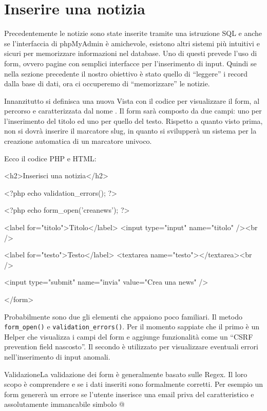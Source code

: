 \section*{Inserire una notizia}
Precedentemente le notizie sono state inserite tramite una istruzione SQL e anche se l'interfaccia di phpMyAdmin è amichevole, esistono altri sistemi più intuitivi e sicuri per memorizzare informazioni nel database. Uno di questi prevede l'uso di form, ovvero pagine con semplici interfacce per l'inserimento di input. Quindi se nella sezione precedente il nostro obiettivo è stato quello di ``leggere'' i record dalla base di dati, ora ci occuperemo di ``memorizzare'' le notizie.

Innanzitutto si definisca una nuova Vista con il codice per visualizzare il form, al percorso  e caratterizzata dal nome . Il form sarà composto da due campi: uno per l'inserimento del titolo ed uno per quello del testo. Rispetto a quanto visto prima, non si dovrà inserire il marcatore slug, in quanto si svilupperà un sistema per la creazione automatica di un marcatore univoco.

Ecco il codice \ac{PHP} e \ac{HTML}:

\begin{code}
<h2>Inserisci una notizia</h2>

<?php echo validation_errors(); ?>

<?php echo form_open('creanews'); ?>

	<label for="titolo">Titolo</label>
	<input type="input" name="titolo" /><br />

	<label for="testo">Testo</label>
	<textarea name="testo"></textarea><br />

	<input type="submit" name="invia" value="Crea una news" />

</form>
\end{code}

Probabilmente sono due gli elementi che appaiono poco familiari. Il metodo \verb|form_open()| e \verb|validation_errors()|. Per il momento sappiate che il primo è un Helper che visualizza i campi del form e aggiunge funzionalità come un ``CSRF prevention field nascosto''. Il secondo è utilizzato per visualizzare eventuali errori nell'inserimento di input anomali.

\begin{deftab}{Validazione}{La validazione dei form è generalmente basato sulle Regex. Il loro scopo è comprendere e se i dati inseriti sono formalmente corretti. Per esempio un form genererà un errore se l'utente inserisce una email priva del caratteristico e assolutamente immancabile simbolo @}
\end{deftab}

